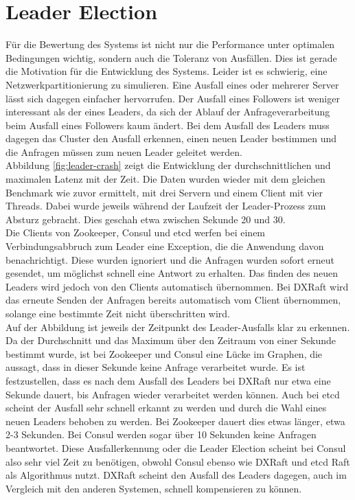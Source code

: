 \section{Leader Election}
\label{leader-election}

Für die Bewertung des Systems ist nicht nur die Performance unter optimalen Bedingungen wichtig, sondern auch die Toleranz von Ausfällen. Dies ist gerade die Motivation für die Entwicklung des Systems. Leider ist es schwierig, eine Netzwerkpartitionierung zu simulieren. Eine Ausfall eines oder mehrerer Server lässt sich dagegen einfacher hervorrufen. Der Ausfall eines Followers ist weniger interessant als der eines Leaders, da sich der Ablauf der Anfrageverarbeitung beim Ausfall eines Followers kaum ändert. Bei dem Ausfall des Leaders muss dagegen das Cluster den Ausfall erkennen, einen neuen Leader bestimmen und die Anfragen müssen zum neuen Leader geleitet werden. \\
Abbildung \ref{fig:leader-crash} zeigt die Entwicklung der durchschnittlichen und maximalen Latenz mit der Zeit. Die Daten wurden wieder mit dem gleichen Benchmark wie zuvor ermittelt, mit drei Servern und einem Client mit vier Threads. Dabei wurde jeweils während der Laufzeit der Leader-Prozess zum Absturz gebracht. Dies geschah etwa zwischen Sekunde 20 und 30. \\
Die Clients von Zookeeper, Consul und etcd werfen bei einem Verbindungsabbruch zum Leader eine Exception, die die Anwendung davon benachrichtigt. Diese wurden ignoriert und die Anfragen wurden sofort erneut gesendet, um möglichst schnell eine Antwort zu erhalten. Das finden des neuen Leaders wird jedoch von den Clients automatisch übernommen. Bei DXRaft wird das erneute Senden der Anfragen bereits automatisch vom Client übernommen, solange eine bestimmte Zeit nicht überschritten wird. \\
Auf der Abbildung ist jeweils der Zeitpunkt des Leader-Ausfalls klar zu erkennen. Da der Durchschnitt und das Maximum über den Zeitraum von einer Sekunde bestimmt wurde, ist bei Zookeeper und Consul eine Lücke im Graphen, die aussagt, dass in dieser Sekunde keine Anfrage verarbeitet wurde. Es ist festzustellen, dass es nach dem Ausfall des Leaders bei DXRaft nur etwa eine Sekunde dauert, bis Anfragen wieder verarbeitet werden können. Auch bei etcd scheint der Ausfall sehr schnell erkannt zu werden und durch die Wahl eines neuen Leaders behoben zu werden. Bei Zookeeper dauert dies etwas länger, etwa 2-3 Sekunden. Bei Consul werden sogar über 10 Sekunden keine Anfragen beantwortet. Diese Ausfallerkennung oder die Leader Election scheint bei Consul also sehr viel Zeit zu benötigen, obwohl Consul ebenso wie DXRaft und etcd Raft als Algorithmus nutzt. DXRaft scheint den Ausfall des Leaders dagegen, auch im Vergleich mit den anderen Systemen, schnell kompensieren zu können. \\
